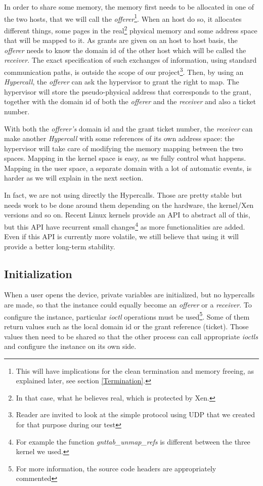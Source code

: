 \documentclass[journal]{IEEEtran}
\begin{document}
In order to share some memory, the memory first needs to be allocated in one of the two hosts, that we will call the \emph{offerer}\footnote{This will have implications for the clean termination and memory freeing, as explained later, see section \ref{Termination}.}. When an host do so, it allocates different things, some pages in the real\footnote{In that case, what he believes real, which is protected by Xen.} physical memory and some address space that will be mapped to it. As grants are given on an host to host basis, the \emph{offerer} needs to know the domain id of the other host which will be called the \emph{receiver}. The exact specification of such exchanges of information, using standard communication paths, is outside the scope of our project\footnote{Reader are invited to look at the simple protocol using UDP that we created for that purpose during our test}. Then, by using an \emph{Hypercall}, the \emph{offerer} can ask the hypervisor to grant the right to map. The hypervisor will store the pseudo-physical address that corresponds to the grant, together with the domain id of both the \emph{offerer} and the \emph{receiver} and also a ticket number.

With both the \emph{offerer's} domain id and the grant ticket number, the \emph{receiver} can make another \emph{Hypercall} with some references of its own address space: the hypervisor will take care of modifying the memory mapping between the two spaces. Mapping in the kernel space is easy, as we fully control what happens. Mapping in the user space, a separate domain with a lot of automatic events, is harder as we will explain in the next section. 

In fact, we are not using directly the Hypercalls. Those are pretty stable but needs work to be done around them depending on the hardware, the kernel/Xen versions and so on. Recent Linux kernels provide an API to abstract all of this, but this API have recurrent small changes\footnote{For example the function \emph{gnttab\_unmap\_refs} is different between the three kernel we used.} as more functionalities are added. Even if this API is currently more volatile, we still believe that using it will provide a better long-term stability.

\subsection{Initialization}

When a user opens the device, private variables are initialized, but no hypercalls are made, so that the instance could equally become an \emph{offerer} or a \emph{receiver}. To configure the instance, particular \emph{ioctl} operations must be used\footnote{For more information, the source code headers are appropriately commented}. Some of them return values such as the local domain id or the grant reference (ticket). 
Those values then need to be shared so that the other process can call appropriate \emph{ioctls} and configure the instance on its own side. 
\end{document}
